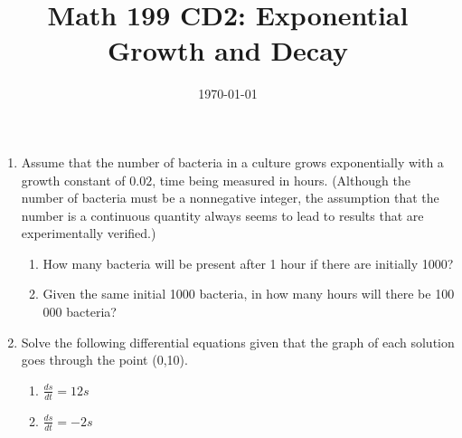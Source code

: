 \documentclass[12pt]{article}
\title{Math 199 CD2: Exponential Growth and Decay}
\date{\today}
\begin{document}
	
	\maketitle
	
	
	
	\begin{enumerate}
		\item Assume that the number of bacteria in a culture grows exponentially with a growth constant of $0.02$, time being	measured in hours. (Although the number of bacteria must be a nonnegative integer, the assumption that the
		number is a continuous quantity always seems to lead to results that are experimentally verified.)
		\begin{enumerate}
			\item How many bacteria will be present after 1 hour if there are initially 1000?
			\vskip 3cm
			\item Given the same initial 1000 bacteria, in how many hours will there be 100 000 bacteria?
			\vskip 3cm
		\end{enumerate}
	
	
		\item Solve the following differential equations given that the graph of each solution goes through the point (0,10).\\

		\begin{enumerate}

		\item $\displaystyle\frac{ds}{dt} = 12s$\\
		\vskip 2cm
		\item 	$\displaystyle\frac{ds}{dt} = -2s$\\
		\vfil

\end{enumerate}

		
	\end{enumerate}
	
\end{document}
